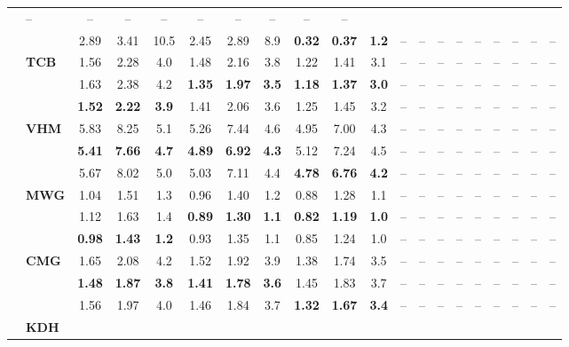 \begin{table}[!t]
\begin{tabular*}{\textwidth}{@{\extracolsep{\fill}}llccc|ccc|ccc|ccc|ccc|ccc@{}}
  & -- & -- & -- & -- & -- & -- & -- & -- & -- \\
& 
  & 2.89 & 3.41 & 10.5 & 2.45 & 2.89 & 8.9 & \textbf{0.32} & \textbf{0.37} & \textbf{1.2}
  & -- & -- & -- & -- & -- & -- & -- & -- & -- \\
& \multirow{3}{*}{\textbf{TCB}} 
  & 1.56 & 2.28 & 4.0 & 1.48 & 2.16 & 3.8 & 1.22 & 1.41 & 3.1
  & -- & -- & -- & -- & -- & -- & -- & -- & -- \\
& 
  & 1.63 & 2.38 & 4.2 & \textbf{1.35} & \textbf{1.97} & \textbf{3.5} & \textbf{1.18} & \textbf{1.37} & \textbf{3.0}
  & -- & -- & -- & -- & -- & -- & -- & -- & -- \\
& 
  & \textbf{1.52} & \textbf{2.22} & \textbf{3.9} & 1.41 & 2.06 & 3.6 & 1.25 & 1.45 & 3.2
  & -- & -- & -- & -- & -- & -- & -- & -- & -- \\
& \multirow{3}{*}{\textbf{VHM}} 
  & 5.83 & 8.25 & 5.1 & 5.26 & 7.44 & 4.6 & 4.95 & 7.00 & 4.3
  & -- & -- & -- & -- & -- & -- & -- & -- & -- \\
& 
  & \textbf{5.41} & \textbf{7.66} & \textbf{4.7} & \textbf{4.89} & \textbf{6.92} & \textbf{4.3} & 5.12 & 7.24 & 4.5
  & -- & -- & -- & -- & -- & -- & -- & -- & -- \\
& 
  & 5.67 & 8.02 & 5.0 & 5.03 & 7.11 & 4.4 & \textbf{4.78} & \textbf{6.76} & \textbf{4.2}
  & -- & -- & -- & -- & -- & -- & -- & -- & -- \\
& \multirow{3}{*}{\textbf{MWG}} 
  & 1.04 & 1.51 & 1.3 & 0.96 & 1.40 & 1.2 & 0.88 & 1.28 & 1.1
  & -- & -- & -- & -- & -- & -- & -- & -- & -- \\
& 
  & 1.12 & 1.63 & 1.4 & \textbf{0.89} & \textbf{1.30} & \textbf{1.1} & \textbf{0.82} & \textbf{1.19} & \textbf{1.0}
  & -- & -- & -- & -- & -- & -- & -- & -- & -- \\
& 
  & \textbf{0.98} & \textbf{1.43} & \textbf{1.2} & 0.93 & 1.35 & 1.1 & 0.85 & 1.24 & 1.0
  & -- & -- & -- & -- & -- & -- & -- & -- & -- \\
& \multirow{3}{*}{\textbf{CMG}} 
  & 1.65 & 2.08 & 4.2 & 1.52 & 1.92 & 3.9 & 1.38 & 1.74 & 3.5
  & -- & -- & -- & -- & -- & -- & -- & -- & -- \\
& 
  & \textbf{1.48} & \textbf{1.87} & \textbf{3.8} & \textbf{1.41} & \textbf{1.78} & \textbf{3.6} & 1.45 & 1.83 & 3.7
  & -- & -- & -- & -- & -- & -- & -- & -- & -- \\
& 
  & 1.56 & 1.97 & 4.0 & 1.46 & 1.84 & 3.7 & \textbf{1.32} & \textbf{1.67} & \textbf{3.4}
  & -- & -- & -- & -- & -- & -- & -- & -- & -- \\
& \multirow{3}{*}{\textbf{KDH}} 

\end{tabular*}
\end{table}
